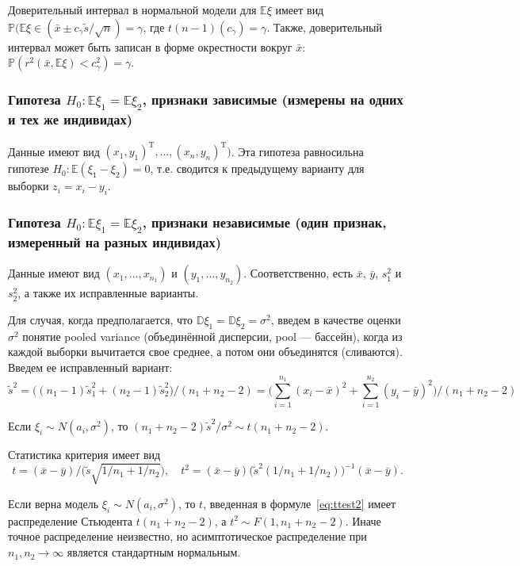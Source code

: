 \documentclass[12 pt]{article}
\def\E{\mathbb{E}}
\def\P{\mathbb{P}}
\def\D{\mathbb{D}}
\begin{document}
Доверительный интервал в нормальной модели для $\E\xi$ имеет вид $\P(\E\xi \in (\bar{x}\pm c_\gamma \widetilde{s}/\sqrt{n}) = \gamma$,
где $t(n-1)(c_\gamma)=\gamma$. Также, доверительный интервал может быть записан в форме окрестности вокруг $\bar{x}$:
$\P(r^2(\bar{x},\E\xi) < c_\gamma^2)=\gamma$.

\subsubsection*{Гипотеза $H_0: \E\xi_1 = \E\xi_2$, признаки зависимые (измерены на одних и тех же индивидах)}
Данные имеют вид $(x_1,y_1)^\textrm{T}, \ldots, (x_n,y_n)^\textrm{T})$.
Эта гипотеза равносильна гипотезе $H_0:\E(\xi_1 -\xi_2) = 0$, т.е. сводится к предыдущему варианту для выборки
$z_i = x_i - y_i$.

\subsubsection*{Гипотеза $H_0: \E\xi_1 = \E\xi_2$, признаки независимые (один признак, измеренный на разных индивидах)}

Данные имеют вид $(x_1, \ldots, x_{n_1})$ и $(y_1, \ldots, y_{n_2})$.
Соответственно, есть $\bar{x}$, $\bar{y}$, $s_1^2$ и $s_2^2$, а также их исправленные варианты.

Для случая, когда предполагается, что $\D\xi_1 = \D\xi_2 = \sigma^2$,
введем в качестве оценки $\sigma^2$ понятие pooled variance (объединённой дисперсии, pool --- бассейн),
когда из каждой выборки вычитается свое среднее, а потом они объединятся (сливаются).
Введем ее исправленный вариант:
\begin{equation*}
\widetilde{s}^2 = \big((n_1-1) \widetilde{s}_1^2 + (n_2-1) \widetilde{s}_2^2\big)/ (n_1+n_2-2)
= \big(\sum_{i=1}^{n_1} (x_i-\bar{x})^2 + \sum_{i=1}^{n_2} (y_i-\bar{y})^2\big)/(n_1+n_2-2)
\end{equation*}

Если $\xi_i \sim N(a_i,\sigma^2)$, то $(n_1+n_2-2)\widetilde{s}^2/\sigma^2 \sim t(n_1+n_2-2)$.

Статистика критерия имеет вид
\begin{equation}
\label{eq:ttest2}
t = (\bar{x} - \bar{y})/\big(\widetilde{s}\sqrt{1/n_1 + 1/n_2}\big),\quad
t^2 = (\bar{x} - \bar{y})\big(\widetilde{s}^2(1/n_1 + 1/n_2)\big)^{-1} (\bar{x} - \bar{y}).
\end{equation}

Если верна модель $\xi_i \sim N(a_i,\sigma^2)$, то $t$, введенная в формуле~\eqref{eq:ttest2} имеет распределение Стьюдента $t(n_1+n_2 - 2)$,
а $t^2\sim F(1,n_1+n_2-2)$.
Иначе точное распределение неизвестно, но асимптотическое распределение при $n_1,n_2 \rightarrow \infty$
является стандартным нормальным.
\end{document}
